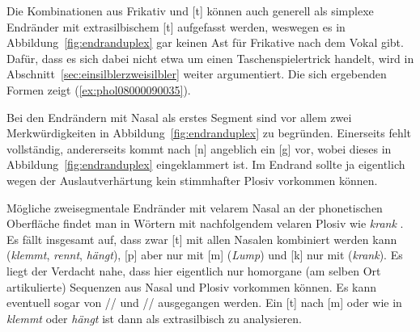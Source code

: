 \begin{exe}
  \ex \label{ex:phol0800009003}
  \begin{xlist}
  \end{xlist}
\end{exe}

Die Kombinationen aus Frikativ und [t] können auch generell als simplexe Endränder mit extrasilbischem [t] aufgefasst werden, weswegen es in Abbildung~\ref{fig:endranduplex} gar keinen Ast für Frikative nach dem Vokal gibt.
Dafür, dass es sich dabei nicht etwa um einen Taschenspielertrick handelt, wird in Abschnitt~\ref{sec:einsilblerzweisilbler} weiter argumentiert.
Die sich ergebenden Formen zeigt (\ref{ex:phol08000090035}).

\begin{exe}
  \ex \label{ex:phol08000090035}
  \begin{xlist}
  \end{xlist}
\end{exe}

Bei den Endrändern mit Nasal als erstes Segment sind vor allem zwei Merkwürdigkeiten in Abbildung~\ref{fig:endranduplex} zu begründen.
Einerseits fehlt \textipa{[N]} vollständig, andererseits kommt nach [n] angeblich ein [g] vor, wobei dieses in Abbildung~\ref{fig:endranduplex} eingeklammert ist.
Im Endrand sollte ja eigentlich wegen der Auslautverhärtung kein stimmhafter Plosiv vorkommen können.

Mögliche zweisegmentale Endränder mit velarem Nasal \textipa{[N]} an der phonetischen Oberfläche findet man in Wörtern mit nachfolgendem velaren Plosiv wie \textit{krank} \textipa{[kKaNk]}.
Es fällt insgesamt auf, dass zwar [t] mit allen Nasalen kombiniert werden kann (\textit{klemmt}, \textit{rennt}, \textit{hängt}), [p] aber nur mit [m] (\textit{Lump}) und [k] nur mit \textipa{[N]} (\textit{krank}).
Es liegt der Verdacht nahe, dass hier eigentlich nur homorgane (am selben Ort artikulierte) Sequenzen aus Nasal und Plosiv vorkommen können.
Es kann eventuell sogar von // \phopro \textipa{[kKaNk]} und // \phopro \textipa{[lUmp]} ausgegangen werden. 
Ein [t] nach [m] oder \textipa{[N]} wie in \textit{klemmt} oder \textit{hängt} ist dann als extrasilbisch zu analysieren.

